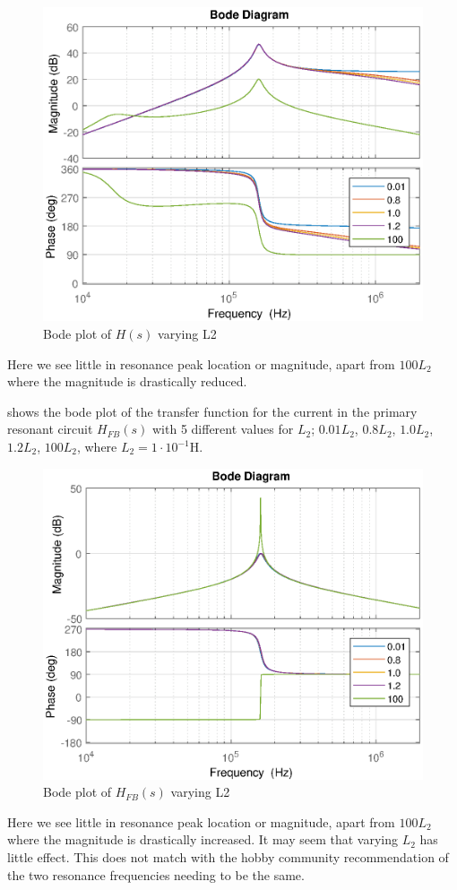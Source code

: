 \begin{figure}[H]
    \centering
    \includegraphics[width=\textwidth]{img/CoilRigBode_L2.eps}
    \caption{Bode plot of $H(s)$ varying L2}
    \label{fig:bode_l2}
\end{figure}

Here we see little in resonance peak location or magnitude, apart from $100 L_2$ where the magnitude is drastically reduced.

 shows the bode plot of the transfer function for the current in the primary resonant circuit $H_{FB}(s)$ with 5 different values for $L_2$; $0.01 L_2$, $0.8 L_2$, $1.0 L_2$, $1.2 L_2$, $100 L_2$, where $L_2 = 1 \cdot 10^{-1}$H.
\begin{figure}[H]
    \centering
    \includegraphics[width=\textwidth]{img/FeedBackBode_L2.eps}
    \caption{Bode plot of $H_{FB}(s)$ varying L2}
    \label{fig:fbbode_l2}
\end{figure}
Here we see little in resonance peak location or magnitude, apart from $100 L_2$ where the magnitude is drastically increased. It may seem that varying $L_2$ has little effect. This does not match with the hobby community recommendation of the two resonance frequencies needing to be the same.
